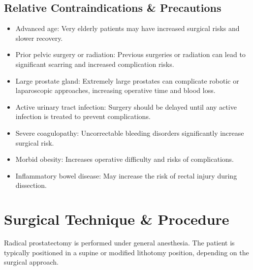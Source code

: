 \subsection*{Relative Contraindications \& Precautions}
\begin{itemize}
  \item Advanced age: Very elderly patients may have increased surgical risks and slower recovery.
  
  \item Prior pelvic surgery or radiation: Previous surgeries or radiation can lead to significant scarring and increased complication risks.
  
  \item Large prostate gland: Extremely large prostates can complicate robotic or laparoscopic approaches, increasing operative time and blood loss.
  
  \item Active urinary tract infection: Surgery should be delayed until any active infection is treated to prevent complications.
  
  \item Severe coagulopathy: Uncorrectable bleeding disorders significantly increase surgical risk.
  
  \item Morbid obesity: Increases operative difficulty and risks of complications.
  
  \item Inflammatory bowel disease: May increase the risk of rectal injury during dissection.
\end{itemize}

\section*{Surgical Technique \& Procedure}
Radical prostatectomy is performed under general anesthesia. The patient is typically positioned in a supine or modified lithotomy position, depending on the surgical approach.

